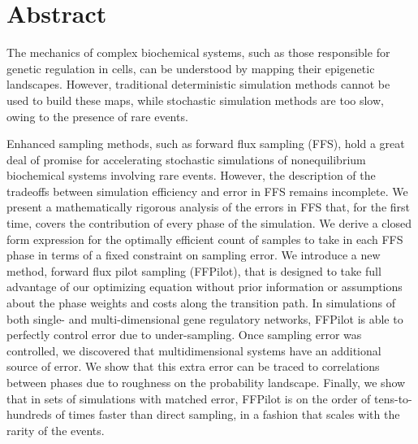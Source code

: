 \chapter*{Abstract}

The mechanics of complex biochemical systems, such as those responsible for genetic regulation in cells, can be understood by mapping their epigenetic landscapes. However, traditional deterministic simulation methods cannot be used to build these maps, while stochastic simulation methods are too slow, owing to the presence of rare events.

Enhanced sampling methods, such as forward flux sampling (FFS), hold a great deal of promise for accelerating stochastic simulations of nonequilibrium biochemical systems involving rare events. However, the description of the tradeoffs between simulation efficiency and error in FFS remains incomplete. We present a mathematically rigorous analysis of the errors in FFS that, for the first time, covers the contribution of every phase of the simulation. We derive a closed form expression for the optimally efficient count of samples to take in each FFS phase in terms of a fixed constraint on sampling error. We introduce a new method, forward flux pilot sampling (FFPilot), that is designed to take full advantage of our optimizing equation without prior information or assumptions about the phase weights and costs along the transition path. In simulations of both single- and multi-dimensional gene regulatory networks, FFPilot is able to perfectly control error due to under-sampling. Once sampling error was controlled, we discovered that multidimensional systems have an additional source of error. We show that this extra error can be traced to correlations between phases due to roughness on the probability landscape. Finally, we show that in sets of  simulations with matched error, FFPilot is on the order of tens-to-hundreds of times faster than direct sampling, in a fashion that scales with the rarity of the events.